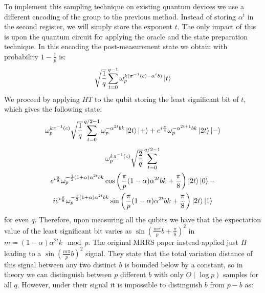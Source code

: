 \documentclass[aps,floatfix,10pt,amssymb,amsfont,amsmath,superscriptaddress,float,nofootinbib,longbibliography,nobalancelastpage,twocolumn]{revtex4-2}
\begin{document}
To implement this sampling technique on existing quantum devices we use a different encoding of the group to the previous method. Instead of storing $\alpha^t$ in the second register, we will simply store the exponent $t$. The only impact of this is upon the quantum circuit for applying the oracle and the state preparation technique. In this encoding the post-measurement state we obtain with probability $1-\frac{1}{p}$ is:
\begin{equation}
    \sqrt{\frac{1}{q}}\sum_{t=0}^{q-1} \omega_p^{k (\pi^{-1}(c) - \alpha^tb)}\ket{t}
\end{equation}
We proceed by applying $HT$ to the qubit storing the least significant bit of $t$, which gives the following state:
\begin{equation}
    \omega_p^{k \pi^{-1}(c)}\sqrt{\frac{1}{q}}\sum_{t=0}^{q/2-1} \omega_p^{- \alpha^{2t}bk}\ket{2t}\ket{+}+ e^{i\frac{\pi}{4}}\omega_p^{ - \alpha^{2t+1}bk}\ket{2t}\ket{-}
\end{equation}
\begin{multline}
    \omega_p^{k \pi^{-1}(c)}\sqrt{\frac{2}{q}}\sum_{t=0}^{q/2-1} \\e^{i\frac{\pi}{8}}\omega_p^{ -\frac{1}{2}(1+\alpha)\alpha^{2t}bk}\cos\left(\frac{\pi}{p}(1-\alpha)\alpha^{2t}bk+ \frac{\pi}{8}\right) \ket{2t}\ket{0}-\\ 
    ie^{i\frac{\pi}{8}}\omega_p^{ -\frac{1}{2}(1+\alpha)\alpha^{2t}bk}\sin \left( \frac{\pi}{p}(1-\alpha)\alpha^{2t}bk + \frac{\pi}{8}\right)\ket{2t}\ket{1}
\end{multline}
for even $q$. Therefore, upon measuring all the qubits we have that the expectation value of the least significant bit varies as $\sin \left( \frac{m\pi}{p}b + \frac{\pi}{8}\right)^2$ in $m=(1-\alpha)\alpha^{2t}k \mod p$. The original MRRS paper instead applied just $H$ leading to a $\sin \left( \frac{m\pi}{p}b\right)^2$ signal. They state that the total variation distance of this signal between any two distinct $b$ is bounded below by a constant, so in theory we can distinguish between $p$ different $b$ with only $O(\log p)$ samples for all $q$. However, under their signal it is impossible to distinguish $b$ from $p-b$ as:
\end{document}
